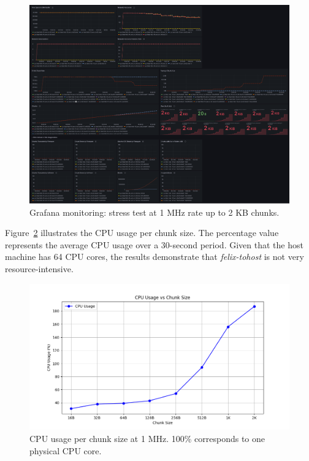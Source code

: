 \begin{figure}[htbp]
\centering
\includegraphics[width=\textwidth]{images/results/tohost-perf.png}
\caption{Grafana monitoring: stress test at 1 MHz rate up to 2 KB chunks.}
\label{fig:tohost-perf}
\end{figure}

Figure~\ref{fig:cpu-usage} illustrates the CPU usage per chunk size. The percentage value represents the average CPU usage over a 30-second period. Given that the host machine has 64 CPU cores, the results demonstrate that \emph{felix-tohost} is not very resource-intensive.

\begin{figure}[htbp]
\centering
\includegraphics[width=\textwidth]{images/results/cpu-usage-chunk-size-1MHz.png}
\caption{CPU usage per chunk size at 1 MHz. 100\% corresponds to one physical CPU core.}
\label{fig:cpu-usage}
\end{figure}


